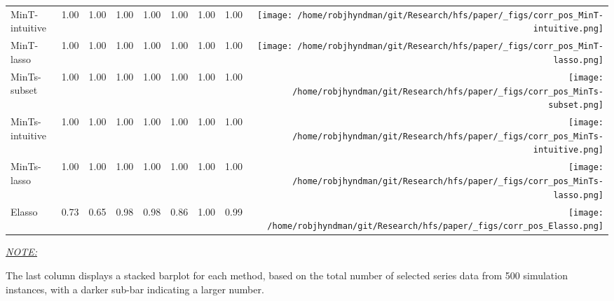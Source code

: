 \documentclass[
  12pt,
  11pt]{article}
\begin{document}
\begin{table}[!h]
\begin{threeparttable}
\begin{tabular}{llrrrrrr>{}r}
MinT-intuitive & 1.00 & 1.00 & 1.00 & 1.00 & 1.00 & 1.00 & 1.00 & \texttt{[image: /home/robjhyndman/git/Research/hfs/paper/\_figs/corr\_pos\_MinT-intuitive.png]}\\
MinT-lasso & 1.00 & 1.00 & 1.00 & 1.00 & 1.00 & 1.00 & 1.00 & \texttt{[image: /home/robjhyndman/git/Research/hfs/paper/\_figs/corr\_pos\_MinT-lasso.png]}\\
\midrule
MinTs-subset & 1.00 & 1.00 & 1.00 & 1.00 & 1.00 & 1.00 & 1.00 & \texttt{[image: /home/robjhyndman/git/Research/hfs/paper/\_figs/corr\_pos\_MinTs-subset.png]}\\
MinTs-intuitive & 1.00 & 1.00 & 1.00 & 1.00 & 1.00 & 1.00 & 1.00 & \texttt{[image: /home/robjhyndman/git/Research/hfs/paper/\_figs/corr\_pos\_MinTs-intuitive.png]}\\
MinTs-lasso & 1.00 & 1.00 & 1.00 & 1.00 & 1.00 & 1.00 & 1.00 & \texttt{[image: /home/robjhyndman/git/Research/hfs/paper/\_figs/corr\_pos\_MinTs-lasso.png]}\\
\midrule
Elasso & 0.73 & 0.65 & 0.98 & 0.98 & 0.86 & 1.00 & 0.99 & \texttt{[image: /home/robjhyndman/git/Research/hfs/paper/\_figs/corr\_pos\_Elasso.png]}\\
\bottomrule
\end{tabular}
\begin{tablenotes}[para]
\item \underline{\textit{NOTE:}} 
\item The last column displays a stacked barplot for each method, based on the total number of selected series data from 500 simulation instances, with a darker sub-bar indicating a larger number.
\end{tablenotes}
\end{threeparttable}
\endgroup{}
\end{table}
\end{document}
